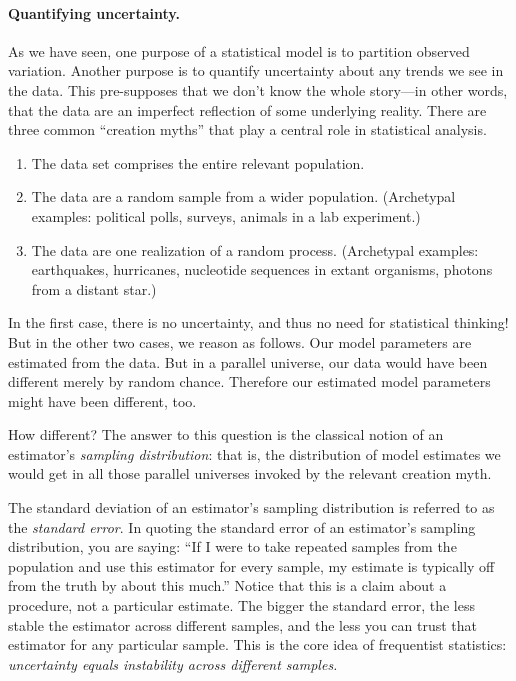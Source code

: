 \documentclass[11pt]{article}
\newcommand{\1}[1]{\mathbf{1}_{\{ {#1} \}}}
\begin{document}
\paragraph{Quantifying uncertainty.}

As we have seen, one purpose of a statistical model is to partition observed variation.  Another purpose is to quantify uncertainty about any trends we see in the data.  This pre-supposes that we don't know the whole story---in other words, that the data are an imperfect reflection of some underlying reality.  There are three common ``creation myths'' that play a central role in statistical analysis.
\begin{enumerate}
\item The data set comprises the entire relevant population.
\item The data are a random sample from a wider population.  (Archetypal examples: political polls, surveys, animals in a lab experiment.)
\item The data are one realization of a random process.  (Archetypal examples: earthquakes, hurricanes, nucleotide sequences in extant organisms, photons from a distant star.)
\end{enumerate}
In the first case, there is no uncertainty, and thus no need for statistical thinking!  But in the other two cases, we reason as follows.  Our model parameters are estimated from the data.  But in a parallel universe, our data would have been different merely by random chance.  Therefore our estimated model parameters might have been different, too.

How different?  The answer to this question is the classical notion of an estimator's \textit{sampling distribution}: that is, the distribution of model estimates we would get in all those parallel universes invoked by the relevant creation myth.

The standard deviation of an estimator's sampling distribution is referred to as the \textit{standard error}.  In quoting the standard error of an estimator's sampling distribution, you are saying: ``If I were to take repeated samples from the population and use this estimator for every sample, my estimate is typically off from the truth by about this much.''  Notice that this is  a claim about a procedure, not a particular estimate.  The bigger the standard error, the less stable the estimator across different samples, and the less you can trust that estimator for any particular sample.  This is the core idea of frequentist statistics: \textit{uncertainty equals instability across different samples.}
\end{document}
